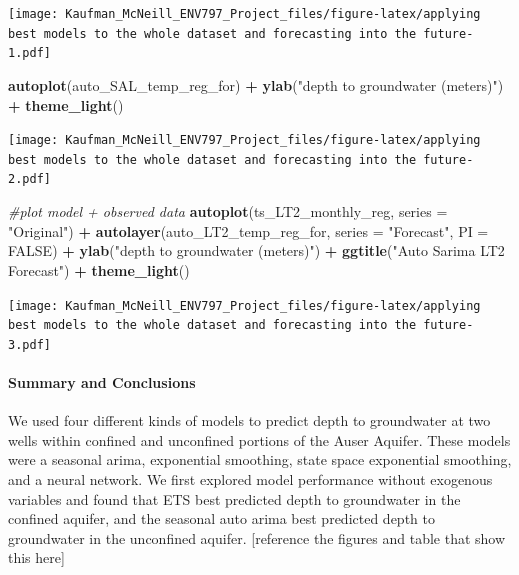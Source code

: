 \documentclass[
]{article}
\newenvironment{Shaded}{\begin{snugshade}}{\end{snugshade}}
\newcommand{\AttributeTok}[1]{\textcolor[rgb]{0.13,0.29,0.53}{#1}}
\newcommand{\CommentTok}[1]{\textcolor[rgb]{0.56,0.35,0.01}{\textit{#1}}}
\newcommand{\ConstantTok}[1]{\textcolor[rgb]{0.56,0.35,0.01}{#1}}
\newcommand{\FunctionTok}[1]{\textcolor[rgb]{0.13,0.29,0.53}{\textbf{#1}}}
\newcommand{\NormalTok}[1]{#1}
\newcommand{\SpecialCharTok}[1]{\textcolor[rgb]{0.81,0.36,0.00}{\textbf{#1}}}
\newcommand{\StringTok}[1]{\textcolor[rgb]{0.31,0.60,0.02}{#1}}
\begin{document}
\texttt{[image: Kaufman\_McNeill\_ENV797\_Project\_files/figure-latex/applying best models to the whole dataset and forecasting into the future-1.pdf]}

\begin{Shaded}
\begin{Highlighting}[]
\FunctionTok{autoplot}\NormalTok{(auto\_SAL\_temp\_reg\_for) }\SpecialCharTok{+} 
  \FunctionTok{ylab}\NormalTok{(}\StringTok{"depth to groundwater (meters)"}\NormalTok{) }\SpecialCharTok{+} 
  \FunctionTok{theme\_light}\NormalTok{()}
\end{Highlighting}
\end{Shaded}

\texttt{[image: Kaufman\_McNeill\_ENV797\_Project\_files/figure-latex/applying best models to the whole dataset and forecasting into the future-2.pdf]}

\begin{Shaded}
\begin{Highlighting}[]
\CommentTok{\#plot model + observed data}
\FunctionTok{autoplot}\NormalTok{(ts\_LT2\_monthly\_reg, }\AttributeTok{series =} \StringTok{"Original"}\NormalTok{) }\SpecialCharTok{+}
  \FunctionTok{autolayer}\NormalTok{(auto\_LT2\_temp\_reg\_for, }\AttributeTok{series =} \StringTok{"Forecast"}\NormalTok{, }\AttributeTok{PI =} \ConstantTok{FALSE}\NormalTok{) }\SpecialCharTok{+}
  \FunctionTok{ylab}\NormalTok{(}\StringTok{"depth to groundwater (meters)"}\NormalTok{) }\SpecialCharTok{+}
  \FunctionTok{ggtitle}\NormalTok{(}\StringTok{"Auto Sarima LT2 Forecast"}\NormalTok{) }\SpecialCharTok{+}
  \FunctionTok{theme\_light}\NormalTok{()}
\end{Highlighting}
\end{Shaded}

\texttt{[image: Kaufman\_McNeill\_ENV797\_Project\_files/figure-latex/applying best models to the whole dataset and forecasting into the future-3.pdf]}

\hypertarget{summary-and-conclusions}{%
\paragraph{Summary and Conclusions}\label{summary-and-conclusions}}

We used four different kinds of models to predict depth to groundwater
at two wells within confined and unconfined portions of the Auser
Aquifer. These models were a seasonal arima, exponential smoothing,
state space exponential smoothing, and a neural network. We first
explored model performance without exogenous variables and found that
ETS best predicted depth to groundwater in the confined aquifer, and the
seasonal auto arima best predicted depth to groundwater in the
unconfined aquifer. {[}reference the figures and table that show this
here{]}
\end{document}
